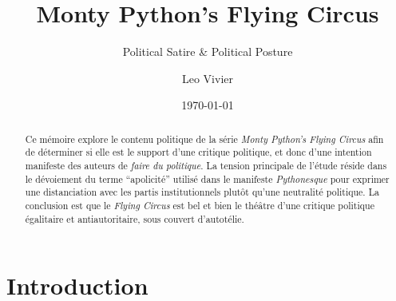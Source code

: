 \documentclass[
,a4paper
,DIV=12
,12pt
,abstract
,bibliography=totoc
]{scrartcl}
\author{Leo Vivier}
\date{\today}
\title{Monty Python's Flying Circus}
\subtitle{Political Satire \& Political Posture}
\begin{document}

\maketitle

\begin{abstract}
  Ce mémoire explore le contenu politique de la série \emph{Monty Python’s Flying Circus} afin de déterminer si elle est le support d’une critique politique, et donc d’une intention manifeste des auteurs de \emph{faire du politique}.  La tension principale de l’étude réside dans le dévoiement du terme \enquote{apolicité} utilisé dans le manifeste \emph{Pythonesque} pour exprimer une distanciation avec les partis institutionnels plutôt qu’une neutralité politique.  La conclusion est que le \emph{Flying Circus} est bel et bien le théâtre d’une critique politique égalitaire et antiautoritaire, sous couvert d’autotélie.
\end{abstract}



\tableofcontents
\clearpage


\section*{Introduction}
\label{sec:proposal}
\end{document}
